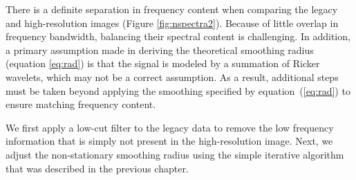     There is a definite separation in frequency content when comparing the legacy and high-resolution images (Figure \ref{fig:nspectra2}). 
    Because of little overlap in frequency bandwidth, balancing their spectral content is challenging. 
    In addition, a primary assumption made in deriving the theoretical smoothing radius (equation \ref{eq:rad}) is that the signal is modeled by a summation of Ricker wavelets, which may not be a correct assumption. 
    As a result, additional steps must be taken beyond applying the smoothing specified by equation~(\ref{eq:rad}) to ensure matching frequency content. 
    
    
    We first apply a low-cut filter to the legacy data to remove the low frequency information that is simply not present in the high-resolution image. 
    Next, we adjust the non-stationary smoothing radius using the simple iterative algorithm \cite[]{locfreq} that was described in the previous chapter. 
    
